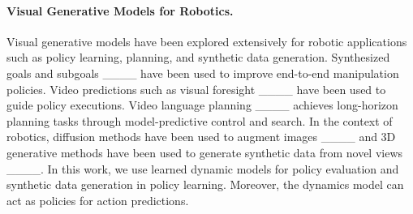\paragraph{Visual Generative Models for Robotics.}
Visual generative models have been explored extensively for robotic applications such as policy learning, planning, and synthetic data generation. Synthesized goals and subgoals ____ have been used to improve end-to-end manipulation policies. Video predictions such as visual foresight ____ have been used to guide policy executions. Video language planning ____ achieves long-horizon planning tasks through model-predictive control and search. In the context of robotics, diffusion methods have been used to augment images 
 ____ and 3D generative methods have been used to generate synthetic data from novel views ____. In this work, we use learned dynamic models for policy evaluation and synthetic data generation in policy learning.  Moreover, the dynamics model can act as policies for action predictions.